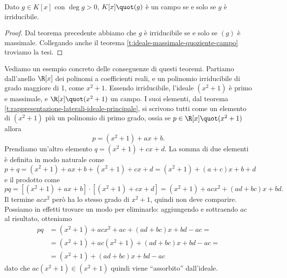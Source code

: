 \begin{corollario}
	Dato $g\in K[x]$ con $\deg g>0$, $K[x]\quot(g)$ è un campo se e solo se $g$ è irriducibile.
\end{corollario}
\begin{proof}
	Dal teorema precedente abbiamo che $g$ è irriducibile se e solo se $(g)$ è massimale.
	Collegando anche il teorema \ref{t:ideale-massimale-quoziente-campo} troviamo la tesi.
\end{proof}
Vediamo un esempio concreto delle conseguenze di questi teoremi.
Partiamo dall'anello $\R[x]$ dei polinomi a coefficienti reali, e un polinomio irriducibile di grado maggiore di 1, come $x^2+1$.
Essendo irriducibile, l'ideale $(x^2+1)$ è primo e massimale, e $\R[x]\quot (x^2+1)$ un campo.
I suoi elementi, dal teorema \ref{t:rappresentazione-laterali-ideale-principale}, si scrivono tutti come un elemento di $(x^2+1)$ più un polinomio di primo grado, ossia se $p\in\R[x]\quot(x^2+1)$ allora
\begin{equation}
	p=(x^2+1)+ax+b.
\end{equation}
Prendiamo un'altro elemento $q=(x^2+1)+cx+d$.
La somma di due elementi è definita in modo naturale come
\begin{equation}
	p+q=(x^2+1)+ax+b+(x^2+1)+cx+d=(x^2+1)+(a+c)x+b+d
\end{equation}
e il prodotto come
\begin{equation}
	pq=[(x^2+1)+ax+b]\cdot[(x^2+1)+cx+d]=(x^2+1)+acx^2+(ad+bc)x+bd.
\end{equation}
Il termine $acx^2$ però ha lo stesso grado di $x^2+1$, quindi non deve comparire.
Possiamo in effetti trovare un modo per eliminarlo: aggiungendo e sottraendo $ac$ al risultato, otteniamo
\begin{equation}
	\begin{split}
		pq&=(x^2+1)+acx^2+ac+(ad+bc)x+bd-ac=\\
		&=(x^2+1)+ac(x^2+1)+(ad+bc)x+bd-ac=\\
		&=(x^2+1)+(ad+bc)x+bd-ac
	\end{split}
\end{equation}
dato che $ac(x^2+1)\in(x^2+1)$ quindi viene ``assorbito'' dall'ideale.

